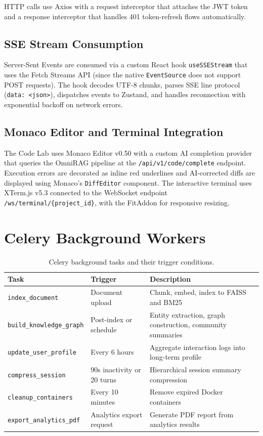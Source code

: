 HTTP calls use Axios with a request interceptor that attaches the JWT token and a response interceptor that handles 401 token-refresh flows automatically.

\subsection{SSE Stream Consumption}
\label{subsec:sse-impl}

Server-Sent Events are consumed via a custom React hook \texttt{useSSEStream} that uses the Fetch Streams API (since the native \texttt{EventSource} does not support POST requests). The hook decodes UTF-8 chunks, parses SSE line protocol (\texttt{data: <json>}), dispatches events to Zustand, and handles reconnection with exponential backoff on network errors.

\subsection{Monaco Editor and Terminal Integration}
\label{subsec:monaco-impl}

The Code Lab uses Monaco Editor v0.50 with a custom AI completion provider that queries the OmniRAG pipeline at the \texttt{/api/v1/code/complete} endpoint. Execution errors are decorated as inline red underlines and AI-corrected diffs are displayed using Monaco's \texttt{DiffEditor} component. The interactive terminal uses XTerm.js v5.3 connected to the WebSocket endpoint \texttt{/ws/terminal/\{project\_id\}}, with the FitAddon for responsive resizing.

\section{Celery Background Workers}
\label{sec:celery-impl}

\begin{table}[ht]
    \centering
    \caption{Celery background tasks and their trigger conditions.}
    \label{tab:celery-tasks}
    \renewcommand{\arraystretch}{1.3}
    \begin{tabular}{l p{3.5cm} p{7cm}}
        \toprule
        \textbf{Task} & \textbf{Trigger} & \textbf{Description} \\
        \midrule
        \texttt{index\_document} & Document upload & Chunk, embed, index to FAISS and BM25 \\
        \texttt{build\_knowledge\_graph} & Post-index or schedule & Entity extraction, graph construction, community summaries \\
        \texttt{update\_user\_profile} & Every 6 hours & Aggregate interaction logs into long-term profile \\
        \texttt{compress\_session} & 90s inactivity or 20 turns & Hierarchical session summary compression \\
        \texttt{cleanup\_containers} & Every 10 minutes & Remove expired Docker containers \\
        \texttt{export\_analytics\_pdf} & Analytics export request & Generate PDF report from analytics results \\
        \bottomrule
    \end{tabular}
\end{table}

